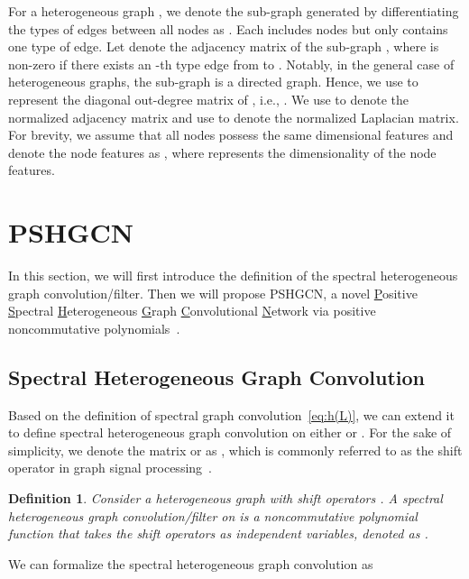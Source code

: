 \documentclass{article}
\newtheorem{definition}{Definition}[section]
\begin{document}
For a heterogeneous graph , we denote the sub-graph generated by differentiating the types of edges between all nodes as . Each  includes  nodes but only contains one type of edge. Let  denote the adjacency matrix of the sub-graph , where  is non-zero if there exists an -th type edge from  to . Notably, in the general case of heterogeneous graphs, the sub-graph  is a directed graph. Hence, we use  to represent the diagonal out-degree matrix of , i.e., . We use  to denote the normalized adjacency matrix and use  to denote the normalized Laplacian matrix. For brevity, we assume that all nodes possess the same dimensional features and denote the node features as , where  represents the dimensionality of the node features. 





\section{PSHGCN}
In this section, we will first introduce the definition of the spectral heterogeneous graph convolution/filter. Then we will propose PSHGCN, a novel \underline{P}ositive \underline{S}pectral \underline{H}eterogeneous \underline{G}raph \underline{C}onvolutional \underline{N}etwork via positive noncommutative polynomials~\cite{positive-poly}.



\subsection{Spectral Heterogeneous Graph Convolution}
Based on the definition of spectral graph convolution~\eqref{eq:h(L)}, we can extend it to define spectral heterogeneous graph convolution on either  or . For the sake of simplicity, we denote the matrix  or  as , which is commonly referred to as the shift operator in graph signal processing~\cite{graphsignal}.


\begin{definition}\label{h_conv}
Consider a heterogeneous graph  with shift operators . A spectral heterogeneous graph convolution/filter on  is a noncommutative polynomial function  that takes the shift operators  as independent variables, denoted as .
\end{definition}
We can formalize the spectral heterogeneous graph convolution  as
\end{document}
